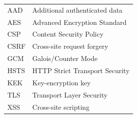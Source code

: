 \begin{longtable}{p{3cm}p{10cm}}
AAD&Additional authenticated data\\
AES&Advanced Encryption Standard\\
CSP&Content Security Policy\\
CSRF&Cross-site request forgery\\
GCM&Galois/Counter Mode\\
HSTS&HTTP Strict Transport Security\\
KEK&Key-encryption key\\
TLS&Transport Layer Security\\
XSS&Cross-site scripting\\
\end{longtable}
\addtocounter{table}{-1} %
